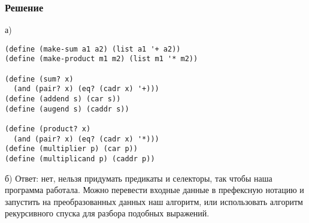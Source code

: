 \documentclass[10pt,a4paper]{article}
\begin{document}
\subsubsection*{Решение}
а)
\begin{lstlisting}
(define (make-sum a1 a2) (list a1 '+ a2))
(define (make-product m1 m2) (list m1 '* m2))

(define (sum? x)
  (and (pair? x) (eq? (cadr x) '+)))
(define (addend s) (car s))
(define (augend s) (caddr s))

(define (product? x)
  (and (pair? x) (eq? (cadr x) '*)))
(define (multiplier p) (car p))
(define (multiplicand p) (caddr p))

\end{lstlisting}
б) Ответ: нет, нельзя придумать предикаты и селекторы, так чтобы наша
программа работала. Можно перевести входные данные в префексную
нотацию и запустить на преобразованных данных наш алгоритм, или
использовать алгоритм рекурсивного спуска для разбора подобных выражений.
\end{document}
